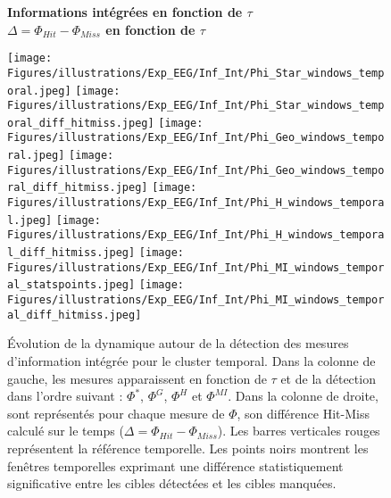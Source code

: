 \begin{figure*}[!t]
\centering
\textbf{Informations intégrées en fonction de $\tau$ ~~~~~~~~~~~~~~~~ $\Delta = \Phi_{Hit} - \Phi_{Miss}$ en fonction de $\tau$}\par\medskip
\texttt{[image: Figures/illustrations/Exp\_EEG/Inf\_Int/Phi\_Star\_windows\_temporal.jpeg]}
\texttt{[image: Figures/illustrations/Exp\_EEG/Inf\_Int/Phi\_Star\_windows\_temporal\_diff\_hitmiss.jpeg]}
\texttt{[image: Figures/illustrations/Exp\_EEG/Inf\_Int/Phi\_Geo\_windows\_temporal.jpeg]}
\texttt{[image: Figures/illustrations/Exp\_EEG/Inf\_Int/Phi\_Geo\_windows\_temporal\_diff\_hitmiss.jpeg]}
\texttt{[image: Figures/illustrations/Exp\_EEG/Inf\_Int/Phi\_H\_windows\_temporal.jpeg]}
\texttt{[image: Figures/illustrations/Exp\_EEG/Inf\_Int/Phi\_H\_windows\_temporal\_diff\_hitmiss.jpeg]}
\texttt{[image: Figures/illustrations/Exp\_EEG/Inf\_Int/Phi\_MI\_windows\_temporal\_statspoints.jpeg]}
\texttt{[image: Figures/illustrations/Exp\_EEG/Inf\_Int/Phi\_MI\_windows\_temporal\_diff\_hitmiss.jpeg]}
\caption[Évolution de la dynamique autour de la détection des mesures d'information intégrée pour le cluster temporal.]{Évolution de la dynamique autour de la détection des mesures d'information intégrée pour le cluster temporal. Dans la colonne de gauche, les mesures apparaissent en fonction de $\tau$ et de la détection dans l'ordre suivant : $\Phi^{*}$, $\Phi^{G}$, $\Phi^{H}$ et $\Phi^{MI}$. Dans la colonne de droite, sont représentés pour chaque mesure de $\Phi$, son différence Hit-Miss calculé sur le temps ($\Delta = \Phi_{Hit} - \Phi_{Miss}$). Les barres verticales rouges représentent la référence temporelle. Les points noirs montrent les fenêtres temporelles exprimant une différence statistiquement significative entre les cibles détectées et les cibles manquées.}
\label{fig:figure5dynamiquemesuresphitemporal}
\end{figure*}


